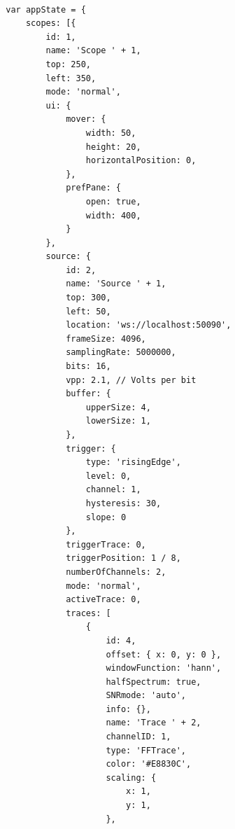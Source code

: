 \begin{tcolorbox}[
        title={
            \refstepcounter{listing}
            Listing \thelisting: JavaScript ``Get 2D Rendering Context''
            \label{lst:js2dcontext}
            \addcontentsline{lol}{listing}{\protect\numberline{\thelisting}}
        }
    ]
    \begin{verbatim}

        var appState = {
            scopes: [{
                id: 1,
                name: 'Scope ' + 1,
                top: 250,
                left: 350,
                mode: 'normal',
                ui: {
                    mover: {
                        width: 50,
                        height: 20,
                        horizontalPosition: 0,
                    },
                    prefPane: {
                        open: true,
                        width: 400,
                    }
                },
                source: {
                    id: 2,
                    name: 'Source ' + 1,
                    top: 300,
                    left: 50,
                    location: 'ws://localhost:50090',
                    frameSize: 4096,
                    samplingRate: 5000000,
                    bits: 16,
                    vpp: 2.1, // Volts per bit
                    buffer: {
                        upperSize: 4,
                        lowerSize: 1,
                    },
                    trigger: {
                        type: 'risingEdge',
                        level: 0,
                        channel: 1,
                        hysteresis: 30,
                        slope: 0
                    },
                    triggerTrace: 0,
                    triggerPosition: 1 / 8,
                    numberOfChannels: 2,
                    mode: 'normal',
                    activeTrace: 0,
                    traces: [
                        {
                            id: 4,
                            offset: { x: 0, y: 0 },
                            windowFunction: 'hann',
                            halfSpectrum: true,
                            SNRmode: 'auto',
                            info: {},
                            name: 'Trace ' + 2,
                            channelID: 1,
                            type: 'FFTrace',
                            color: '#E8830C',
                            scaling: {
                                x: 1,
                                y: 1,
                            },

\end{verbatim}
\end{tcolorbox}
